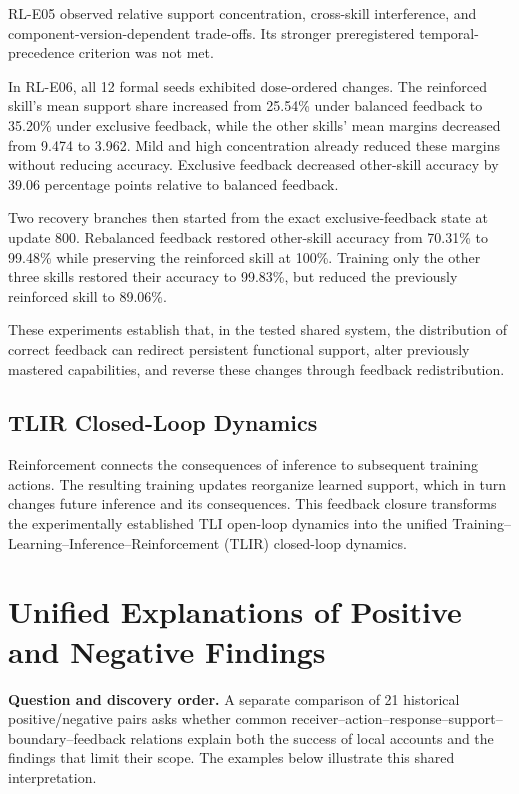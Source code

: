 \documentclass[10pt,twocolumn,letterpaper]{article}
\begin{document}
RL-E05 observed relative support concentration, cross-skill interference, and component-version-dependent trade-offs. Its stronger preregistered temporal-precedence criterion was not met.

In RL-E06, all 12 formal seeds exhibited dose-ordered changes. The reinforced skill's mean support share increased from 25.54\% under balanced feedback to 35.20\% under exclusive feedback, while the other skills' mean margins decreased from 9.474 to 3.962. Mild and high concentration already reduced these margins without reducing accuracy. Exclusive feedback decreased other-skill accuracy by 39.06 percentage points relative to balanced feedback.

Two recovery branches then started from the exact exclusive-feedback state at update 800. Rebalanced feedback restored other-skill accuracy from 70.31\% to 99.48\% while preserving the reinforced skill at 100\%. Training only the other three skills restored their accuracy to 99.83\%, but reduced the previously reinforced skill to 89.06\%.

These experiments establish that, in the tested shared system, the distribution of correct feedback can redirect persistent functional support, alter previously mastered capabilities, and reverse these changes through feedback redistribution.

\subsection{TLIR Closed-Loop Dynamics}
Reinforcement connects the consequences of inference to subsequent training actions. The resulting training updates reorganize learned support, which in turn changes future inference and its consequences. This feedback closure transforms the experimentally established TLI open-loop dynamics into the unified Training--Learning--Inference--Reinforcement (TLIR) closed-loop dynamics.

\section{Unified Explanations of Positive and Negative Findings}
\label{sec:unified}
\noindent\textbf{Question and discovery order.}
A separate comparison of 21 historical positive/negative pairs asks whether common receiver--action--response--support--boundary--feedback relations explain both the success of local accounts and the findings that limit their scope. The examples below illustrate this shared interpretation.
\end{document}
